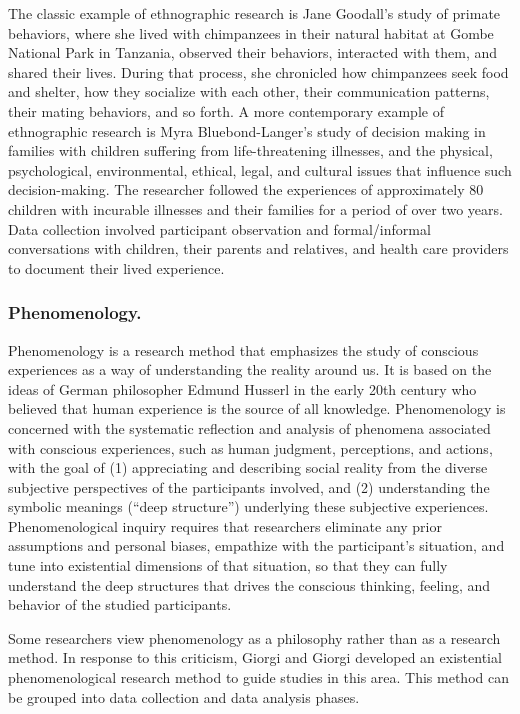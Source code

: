 The classic example of ethnographic research is Jane Goodall's study of primate behaviors, where she lived with chimpanzees in their natural habitat at Gombe National Park in Tanzania, observed their behaviors, interacted with them, and shared their lives. During that process, she chronicled how chimpanzees seek food and shelter, how they socialize with each other, their communication patterns, their mating behaviors, and so forth. A more contemporary example of ethnographic research is Myra Bluebond-Langer's\cite{bluebond2000shadow} study of decision making in families with children suffering from life-threatening illnesses, and the physical, psychological, environmental, ethical, legal, and cultural issues that influence such decision-making. The researcher followed the experiences of approximately 80 children with incurable illnesses and their families for a period of over two years. Data collection involved participant observation and formal/informal conversations with children, their parents and relatives, and health care providers to document their lived experience.

\subsubsection{Phenomenology.} Phenomenology is a research method that emphasizes the study of conscious experiences as a way of understanding the reality around us. It is based on the ideas of German philosopher Edmund Husserl in the early 20th century who believed that human experience is the source of all knowledge. Phenomenology is concerned with the systematic reflection and analysis of phenomena associated with conscious experiences, such as human judgment, perceptions, and actions, with the goal of (1) appreciating and describing social reality from the diverse subjective perspectives of the participants involved, and (2) understanding the symbolic meanings (``deep structure'') underlying these subjective experiences. Phenomenological inquiry requires that researchers eliminate any prior assumptions and personal biases, empathize with the participant's situation, and tune into existential dimensions of that situation, so that they can fully understand the deep structures that drives the conscious thinking, feeling, and behavior of the studied participants.

Some researchers view phenomenology as a philosophy rather than as a research method. In response to this criticism, Giorgi and Giorgi\cite{giorgi2003phenomenology} developed an existential phenomenological research method to guide studies in this area. This method can be grouped into data collection and data analysis phases. 

